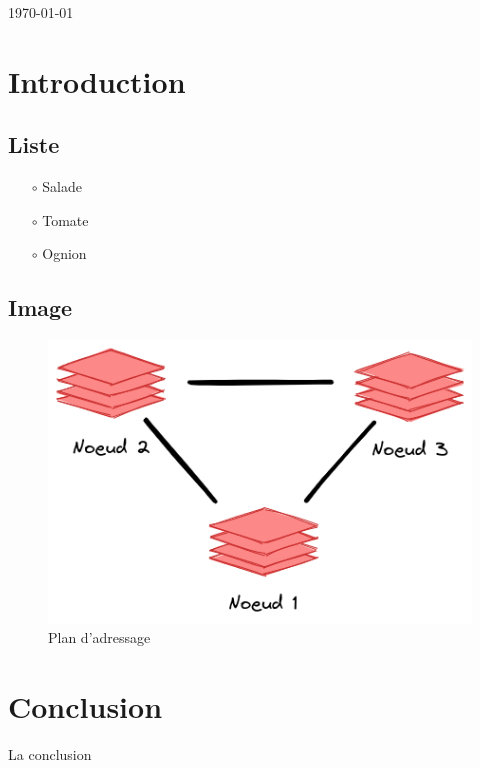 \documentclass[12pt]{article}
\begin{document}
\begin{titlepage}

{\large \today}\\[2cm] %

\vfill %

\end{titlepage}

\tableofcontents
\newpage

\section{Introduction}
\subsection{Liste}

\begin{enumerate}
\item [$\circ$] Salade
\item [$\circ$] Tomate
\item [$\circ$] Ognion
\end{enumerate}

\subsection{Image}

\begin{figure}[htp!]
  \centering
  \includegraphics[width=1\textwidth]{assets/screenshots/noeuds.png}
  \caption{Plan d'adressage}
  \label{fig:figure1}
\end{figure}

\section{Conclusion}

La conclusion
\end{document}
